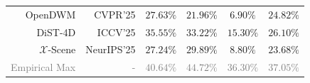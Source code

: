 \begin{table}
{\begin{tabular}{r|r|cccc}
        OpenDWM \cite{opendwm} & {\small CVPR'25} & $27.63\%$ & $21.96\%$ & $6.90\%$ & $24.82\%$
        \\
        DiST-4D \cite{guo2025dist-4d} & {\small ICCV'25} & \cellcolor{w_yellow!20}$\mathbf{35.55\%}$ & \cellcolor{w_yellow!20}$\mathbf{33.22}\%$ & \cellcolor{w_yellow!20}$\mathbf{15.30}\%$ & \underline{$26.10\%$}
        \\
        $\mathcal{X}$-Scene \cite{yang2025x-scene} & {\small NeurIPS'25} & $27.24\%$ & $29.89\%$ & $8.80\%$ & $23.68\%$
        \\
        \midrule
        \rowcolor{gray!7}\textcolor{gray}{Empirical Max} & \textcolor{gray}{-} & \textcolor{gray}{$40.64\%$} & \textcolor{gray}{$44.72\%$} & \textcolor{gray}{$36.30\%$} & \textcolor{gray}{$37.05\%$}
        \\
        \bottomrule
    \end{tabular}}
    \vspace{-0.7cm}
\end{table}
